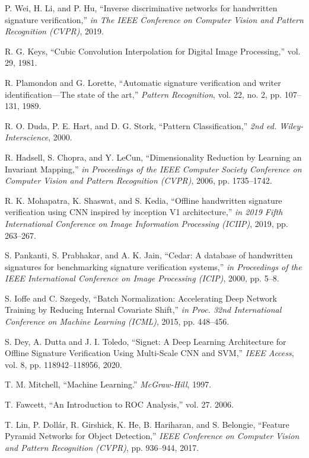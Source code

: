 \begin{thebibliography}{10}
P. Wei, H. Li, and P. Hu, ``Inverse discriminative networks for handwritten signature verification,'' {\em in The IEEE Conference on Computer Vision and Pattern Recognition (CVPR)},
2019.

R. G. Keys, ``Cubic Convolution Interpolation for Digital Image Processing,'' vol. 29,
1981.

R. Plamondon and G. Lorette, ``Automatic signature verification and writer identification—The state of the art,'' {\em Pattern Recognition}, vol. 22, no. 2, pp. 107--131,
1989.

R. O. Duda, P. E. Hart, and D. G. Stork, ``Pattern Classification,'' {\em 2nd ed. Wiley-Interscience},
2000.

R. Hadsell, S. Chopra, and Y. LeCun, ``Dimensionality Reduction by Learning an Invariant Mapping,'' {\em in Proceedings of the IEEE Computer Society Conference on Computer Vision and Pattern Recognition (CVPR)},
2006, pp. 1735--1742.

R. K. Mohapatra, K. Shaswat, and S. Kedia, ``Offline handwritten signature verification using CNN inspired by inception V1 architecture,'' {\em in 2019 Fifth International Conference on Image Information Processing (ICIIP)},
2019, pp. 263--267.

S. Pankanti, S. Prabhakar, and A. K. Jain, ``Cedar: A database of handwritten signatures for benchmarking signature verification systems,'' {\em in Proceedings of the IEEE International Conference on Image Processing (ICIP)},
2000, pp. 5--8.

S. Ioffe and C. Szegedy, ``Batch Normalization: Accelerating Deep Network Training by Reducing Internal Covariate Shift,'' {\em in Proc. 32nd International Conference on Machine Learning (ICML)},
2015, pp. 448--456.

S. Dey, A. Dutta and J. I. Toledo, ``Signet: A Deep Learning Architecture for Offline Signature Verification Using Multi-Scale CNN and SVM,'' {\em IEEE Access}, vol. 8, pp. 118942--118956,
2020.

T. M. Mitchell, ``Machine Learning.'' {\em McGraw-Hill},
1997.

T. Fawcett, ``An Introduction to ROC Analysis,'' vol. 27.
2006.

T. Lin, P. Dollár, R. Girshick, K. He, B. Hariharan, and S. Belongie, ``Feature Pyramid Networks for Object Detection,'' {\em IEEE Conference on Computer Vision and Pattern Recognition (CVPR)}, pp. 936--944,
2017.


\end{thebibliography}
